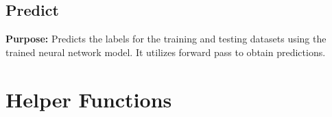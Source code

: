 \documentclass[12pt]{article}
\begin{document}
	\subsection{Predict}
	\textbf{Purpose:} Predicts the labels for the training and testing datasets using the trained neural network model. It utilizes forward pass to obtain predictions.
	

	\section{Helper Functions}
\end{document}
